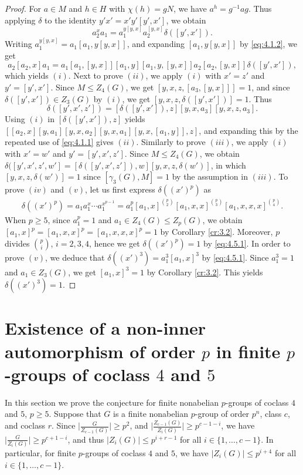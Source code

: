 \documentclass[preprint,sort&compress,12pt]{elsarticle}
\theoremstyle{definition}
\numberwithin{equation}{theorem}
\begin{document}
\begin{proof}
For $a\in M$ and $h\in H$ with $\chi(h)=gN$, we have $a^h= g^{-1}ag$. Thus applying $\delta$ to the identity $y'x'=x'y'[y', x']$, we obtain
\begin{equation*}
a_2^xa_1= a_1^{y[y, x]} a_2^{[y, x]} \delta([y', x']).
\end{equation*}
\noindent Writing $a_1^{y[y, x]}= a_1[a_1, y[y, x]]$, and expanding $[a_1, y[y, x]]$ by \eqref{eq:4.1.2}, we get 
\begin{equation*}
a_2[a_2, x]a_1= a_1[a_1, [y, x]] [a_1, y] [a_1, y, [y, x]] a_2[a_2, [y, x]] \delta([y', x']),
\end{equation*}
\noindent which yields $(i)$. Next to prove $(ii)$, we apply $(i)$ with $x'= z'$ and $y'= [y', x']$. Since $M\le Z_4(G)$, we get $[y, x, z, [a_3, [y, x]]]=1$, and since $\delta([y', x'])\in Z_3(G)$ by $(i)$, we get $[y, x, z, \delta([y', x'])]=1$. Thus 
\begin{equation*}
\delta([y', x', z'])= [\delta([y', x']), z] [y, x, a_3] [y, x, z, a_3].
\end{equation*}
\noindent Using $(i)$ in $[\delta([y', x']), z]$ yields $[[a_2, x] [y, a_1] [y, x, a_2] [y, x, a_1] [y, x, [a_1, y]], z]$, and expanding this by the repeated use of \eqref{eq:4.1.1} gives $(ii)$. Similarly to prove $(iii)$, we apply $(i)$ with $x'=w'$ and $y'=[y', x', z']$. Since $M\le Z_4(G)$, we obtain $\delta([y', x', z', w']= [\delta([y', x', z']), w] [y, x, z, \delta(w')]$, in which $[y, x, z, \delta(w')]=1$ since $[\gamma_3(G), M]=1$ by the assumption in $(iii)$. To prove $(iv)$ and $(v)$, let us first express $\delta((x')^p)$ as
\begin{align}\label{eq:4.5.1} 
\delta((x')^p)= a_1a_1^x\cdots a_1^{x^{p-1}}= a_1^p[a_1, x]^{{p}\choose{2}} [a_1, x, x]^{{p}\choose{3}} [a_1, x, x, x]^{{p}\choose{4}}.
\end{align}
\noindent When $p\ge 5$, since $a_1^p=1$ and $a_1\in Z_4(G)\le Z_p(G)$, we obtain $[a_1, x]^p=[a_1, x, x]^p=[a_1, x, x, x]^p=1$ by Corollary \ref{cr:3.2}. Moreover, $p$ divides ${{p}\choose{i}}$, $i=2, 3, 4$, hence we get $\delta((x')^p)=1$ by \eqref{eq:4.5.1}. In order to prove $(v)$, we deduce that $\delta((x')^3)= a_1^3[a_1, x]^3$ by \eqref{eq:4.5.1}. Since $a_1^3=1$ and $a_1\in Z_3(G)$, we get $[a_1, x]^3=1$ by Corollary \ref{cr:3.2}. This yields $\delta((x')^3)=1$.
\end{proof}

\section{Existence of a non-inner automorphism of order $p$ in finite $p$-groups of coclass $4$ and $5$}
In this section we prove the conjecture for finite nonabelian $p$-groups of coclass $4$ and $5$, $p\ge 5$. Suppose that $G$ is a finite nonabelian $p$-group of order $p^n$, class $c$, and coclass $r$. Since $\big|\frac{G}{Z_{c-1}(G)}\big|\ge p^2$, and $\big|\frac{Z_{c-1}(G)}{Z_i(G)}\big|\ge p^{c-1-i}$, we have $\big|\frac{G}{Z_i(G)}\big|\ge p^{c+1-i}$, and thus $|Z_i(G)|\le p^{i+r-1}$ for all $i\in \{1, \ldots, c-1\}$. In particular, for finite $p$-groups of coclass $4$ and $5$, we have $|Z_i(G)|\le p^{i+4}$ for all $i\in\{1, \ldots, c-1\}$.
\end{document}
